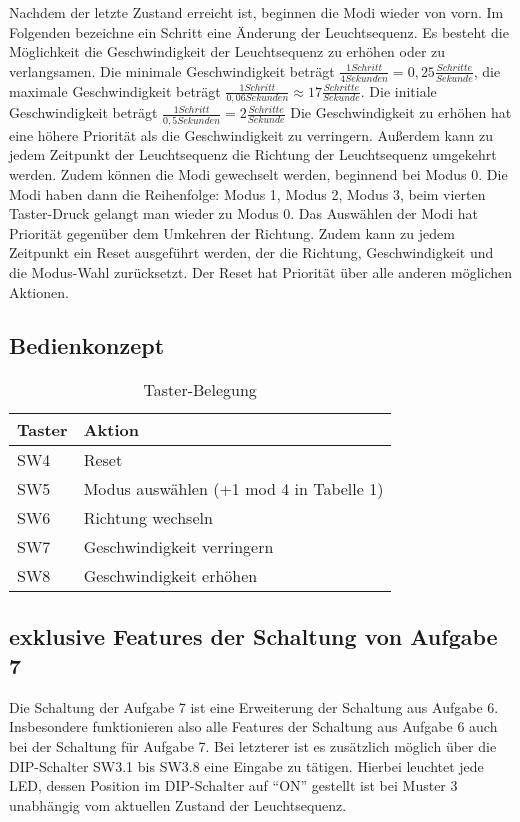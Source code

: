 \documentclass[parskip=full]{scrartcl}
\begin{document}
			Nachdem der letzte Zustand erreicht ist, beginnen die Modi wieder von vorn.
			Im Folgenden bezeichne ein Schritt eine Änderung der Leuchtsequenz.
			 Es besteht die Möglichkeit die Geschwindigkeit der Leuchtsequenz zu erhöhen oder zu verlangsamen. Die minimale Geschwindigkeit beträgt $\frac{1 Schritt}{4 Sekunden} = 0,25 \frac{Schritte}{Sekunde}$, die maximale Geschwindigkeit beträgt $\frac{1 Schritt}{0,06 Sekunden} \approx 17 \frac{Schritte}{Sekunde}$. Die initiale Geschwindigkeit beträgt $\frac{1 Schritt}{0,5 Sekunden} = 2 \frac{Schritte}{Sekunde}$ Die Geschwindigkeit zu erhöhen hat eine höhere Priorität als die Geschwindigkeit zu verringern.
			Außerdem kann zu jedem Zeitpunkt der Leuchtsequenz die Richtung der Leuchtsequenz umgekehrt werden.
			Zudem können die Modi gewechselt werden, beginnend bei Modus 0. Die Modi haben dann die Reihenfolge: Modus 1, Modus 2, Modus 3, beim vierten Taster-Druck gelangt man wieder zu Modus 0.
			Das Auswählen der Modi hat Priorität gegenüber dem Umkehren der Richtung.
			Zudem kann zu jedem Zeitpunkt ein Reset ausgeführt werden, der die Richtung, Geschwindigkeit und die Modus-Wahl zurücksetzt.
			Der Reset hat Priorität über alle anderen möglichen Aktionen.
			
			\subsection{Bedienkonzept}
				\begin{table}[H]
					\centering
					\caption{Taster-Belegung}
					\label{my-label}
					\begin{tabular}{l|l}
						Taster & Aktion                                  \\
						\hline
						SW4    & Reset                                   \\
						SW5    & Modus auswählen (+1 mod 4 in Tabelle 1) \\
						SW6    & Richtung wechseln                       \\
						SW7    & Geschwindigkeit verringern              \\
						SW8    & Geschwindigkeit erhöhen                
					\end{tabular}
				\end{table}
			
			\subsection{exklusive Features der Schaltung von Aufgabe 7}
				Die Schaltung der Aufgabe 7 ist eine Erweiterung der Schaltung aus Aufgabe 6. Insbesondere funktionieren also alle Features der Schaltung aus Aufgabe 6 auch bei der Schaltung für Aufgabe 7.
				Bei letzterer ist es zusätzlich möglich über die DIP-Schalter SW3.1 bis SW3.8 eine Eingabe zu tätigen. Hierbei leuchtet jede LED, dessen Position im DIP-Schalter auf \enquote{ON} gestellt ist bei Muster 3 unabhängig vom aktuellen Zustand der Leuchtsequenz.
	
\end{document}
